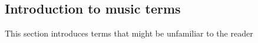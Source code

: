 \documentclass[../../sections/introduction.tex]{subfiles}
\begin{document}
\subsection{Introduction to music terms}

    This section introduces terms that might be unfamiliar
    to the reader
\end{document}
